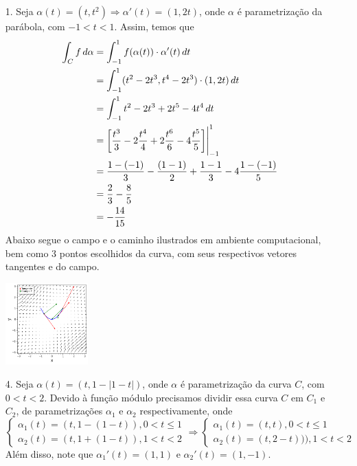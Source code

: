 \documentclass[../main.tex]{subfiles}
\begin{document}
	\begin{solucao}
		\begin{enumerate}
			\item[1.] Seja $\alpha(t)=(t,t^2)\Rightarrow \alpha'(t)=(1,2t)$, onde $\alpha$ é parametrização da parábola, com $-1<t<1$. Assim, temos que
			\begin{align*}
				\int_C f\, d\alpha
				&=\int_{-1}^1 f(\alpha(t))\cdot \alpha'(t)\, dt\\
				&=\int_{-1}^1 (t^2-2t^3, t^4-2t^3)\cdot (1,2t)\, dt\\
				&=\int_{-1}^1 t^2-2t^3+2t^5-4t^4\, dt \\
				&=\bigg[\frac{t^3}{3}-2\frac{t^4}{4}+2\frac{t^6}{6}-4\frac{t^5}{5}\bigg]\Biggr{|}_{-1}^1\\
				&=\frac{1-(-1)}{3}-\frac{(1-1)}{2}+\frac{1-1}{3}-4\frac{1-(-1)}{5}\\
				&=\frac{2}{3}-\frac{8}{5}\\
				&=-\frac{14}{15}
			\end{align*}
			Abaixo segue o campo e o caminho ilustrados em ambiente computacional, bem como 3 pontos escolhidos da curva, com seus respectivos vetores tangentes e do campo.
			\begin{center}
				\includegraphics[width=0.25\textwidth]{imagens/lista06/picture_lista06_q01_item01.png}
			\end{center}
			\item[4.] Seja $\alpha(t)=(t,1-|1-t|)$, onde $\alpha$ é parametrização da curva $C$, com $0<t<2$. Devido à função módulo precisamos dividir essa curva $C$ em $C_1$ e $C_2$, de parametrizações $\alpha_1$ e $\alpha_2$ respectivamente, onde
			\[
			\begin{cases} \alpha_1(t)=(t,1-(1-t)), 0<t\leq 1 \\ \alpha_2(t)=(t,1+(1-t)), 1<t<2 \end{cases}\Rightarrow \begin{cases} \alpha_1(t)=(t,t), 0<t\leq 1 \\ \alpha_2(t)=(t,2-t))), 1<t<2 \end{cases}
			\]
			Além disso, note que $\alpha_1'(t)=(1,1)$ e $\alpha_2'(t)=(1,-1)$.

\end{enumerate}
\end{solucao}
\end{document}
